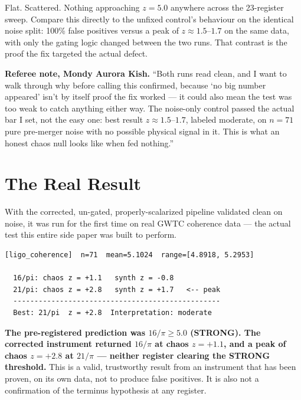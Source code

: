 \documentclass[11pt, letterpaper, openany]{book}
\begin{document}
Flat. Scattered. Nothing approaching $z=5.0$ anywhere across the
23-register sweep. Compare this directly to the unfixed control's
behaviour on the identical noise split: 100\% false positives versus a
peak of $z\approx1.5$--$1.7$ on the same data, with only the gating
logic changed between the two runs. That contrast is the proof the fix
targeted the actual defect.

\begin{warningbox}
\textbf{Referee note, Mondy Aurora Kish.} ``Both runs read clean, and I
want to walk through why before calling this confirmed, because `no big
number appeared' isn't by itself proof the fix worked --- it could also
mean the test was too weak to catch anything either way. The noise-only
control passed the actual bar I set, not the easy one: best result
$z\approx1.5$--$1.7$, labeled moderate, on $n=71$ pure pre-merger noise
with no possible physical signal in it. This is what an honest chaos
null looks like when fed nothing.''
\end{warningbox}

\clearpage
\section{The Real Result}

With the corrected, un-gated, properly-scalarized pipeline validated
clean on noise, it was run for the first time on real GWTC coherence
data --- the actual test this entire side paper was built to perform.

\begin{lstlisting}[style=terminal]
[ligo_coherence]  n=71  mean=5.1024  range=[4.8918, 5.2953]

  16/pi: chaos z = +1.1   synth z = -0.8
  21/pi: chaos z = +2.8   synth z = +1.7   <-- peak
  -------------------------------------------------
  Best: 21/pi  z = +2.8  Interpretation: moderate
\end{lstlisting}

\begin{signalbox}
\textbf{The pre-registered prediction was $16/\pi \geq 5.0$ (STRONG).
The corrected instrument returned $16/\pi$ at chaos $z=+1.1$, and a peak
of chaos $z=+2.8$ at $21/\pi$ --- neither register clearing the STRONG
threshold.} This is a valid, trustworthy result from an instrument that
has been proven, on its own data, not to produce false positives. It is
also not a confirmation of the terminus hypothesis at any register.
\end{signalbox}
\end{document}
